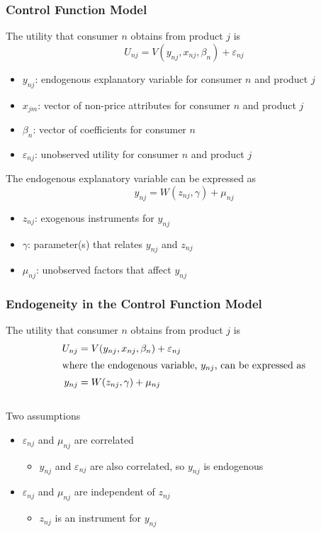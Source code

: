 \documentclass{beamer}
\begin{document}
\begin{frame}\frametitle{Control Function Model}
    The utility that consumer $n$ obtains from product $j$ is
    $$U_{nj} = V(y_{nj}, x_{nj}, \beta_n) + \varepsilon_{nj}$$
    \vspace{-3ex}
    \begin{itemize}
        \item $y_{nj}$: endogenous explanatory variable for consumer $n$ and product $j$
        \item $x_{jm}$: vector of non-price attributes for consumer $n$ and product $j$
        \item $\beta_n$: vector of coefficients for consumer $n$
        \item $\varepsilon_{nj}$: unobserved utility for consumer $n$ and product $j$
    \end{itemize}
    \vspace{2ex}
    The endogenous explanatory variable can be expressed as
    $$y_{nj} = W(z_{nj}, \gamma) + \mu_{nj}$$
    \vspace{-3ex}
    \begin{itemize}
        \item $z_{nj}$: exogenous instruments for $y_{nj}$
        \item $\gamma$: parameter(s) that relates $y_{nj}$ and $z_{nj}$
        \item $\mu_{nj}$: unobserved factors that affect $y_{nj}$
    \end{itemize}
\end{frame}

\begin{frame}\frametitle{Endogeneity in the Control Function Model}
    The utility that consumer $n$ obtains from product $j$ is
    \begin{align*}
        U_{nj} &= V(y_{nj}, x_{nj}, \beta_n) + \varepsilon_{nj} \\
        \intertext{where the endogenous variable, $y_{nj}$, can be expressed as}
        y_{nj} &= W(z_{nj}, \gamma) + \mu_{nj}
    \end{align*} \\
    \vspace{2ex}
    Two assumptions
    \begin{itemize}
        \item $\varepsilon_{nj}$ and $\mu_{nj}$ are correlated
        \begin{itemize}
            \item $y_{nj}$ and $\varepsilon_{nj}$ are also correlated, so $y_{nj}$ is endogenous
        \end{itemize}
        \item $\varepsilon_{nj}$ and $\mu_{nj}$ are independent of $z_{nj}$
        \begin{itemize}
            \item $z_{nj}$ is an instrument for $y_{nj}$
        \end{itemize}
    \end{itemize}
\end{frame}
\end{document}
